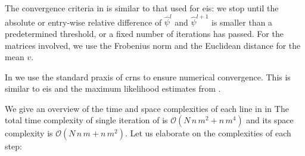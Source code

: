 The convergence criteria in  is similar to that used for \gls{eis}: we stop until the absolute or entry-wise relative difference of $\hat\psi^{l}$ and $\hat \psi^{l + 1}$ is smaller than a predetermined threshold, or a fixed number of iterations has passed. For the matrices involved, we use the Frobenius norm and the Euclidean distance for the mean $v$. 

In  we use the standard praxis of \glspl{crn} to ensure numerical convergence. This is similar to \gls{eis} and the maximum likelihood estimates from .

We give an overview of the time and space complexities of each line in  in 
The total time complexity of single iteration of  is $\mathcal O \left( N\,n\,m^{2} + n\,m^{4}\right)$ and its space complexity is $\mathcal O \left( N\,n\,m + n\,m^{2}\right)$. Let us elaborate on the complexities of each step:
